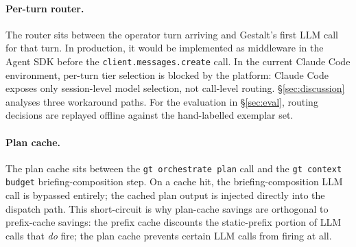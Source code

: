 \paragraph{Per-turn router.}
The router sits between the operator turn arriving and Gestalt's
first LLM call for that turn.  In production, it would be implemented
as middleware in the Agent SDK before the \texttt{client.messages.create}
call.  In the current Claude Code environment, per-turn tier selection
is blocked by the platform: Claude Code exposes only session-level
model selection, not call-level routing.  §\ref{sec:discussion}
analyses three workaround paths.  For the evaluation in
§\ref{sec:eval}, routing decisions are replayed offline against the
hand-labelled exemplar set.

\paragraph{Plan cache.}
The plan cache sits between the \texttt{gt orchestrate plan} call
and the \texttt{gt context budget} briefing-composition step.
On a cache hit, the briefing-composition LLM call is bypassed entirely;
the cached plan output is injected directly into the dispatch path.
This short-circuit is why plan-cache savings are orthogonal to
prefix-cache savings: the prefix cache discounts the static-prefix
portion of LLM calls that \emph{do} fire; the plan cache prevents
certain LLM calls from firing at all.
